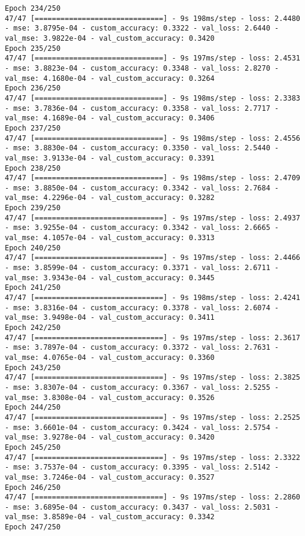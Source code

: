 \begin{lstlisting}
Epoch 234/250
47/47 [==============================] - 9s 198ms/step - loss: 2.4480 - mse: 3.8795e-04 - custom_accuracy: 0.3322 - val_loss: 2.6440 - val_mse: 3.9822e-04 - val_custom_accuracy: 0.3420
Epoch 235/250
47/47 [==============================] - 9s 197ms/step - loss: 2.4531 - mse: 3.8823e-04 - custom_accuracy: 0.3348 - val_loss: 2.8270 - val_mse: 4.1680e-04 - val_custom_accuracy: 0.3264
Epoch 236/250
47/47 [==============================] - 9s 198ms/step - loss: 2.3383 - mse: 3.7836e-04 - custom_accuracy: 0.3358 - val_loss: 2.7717 - val_mse: 4.1689e-04 - val_custom_accuracy: 0.3406
Epoch 237/250
47/47 [==============================] - 9s 198ms/step - loss: 2.4556 - mse: 3.8830e-04 - custom_accuracy: 0.3350 - val_loss: 2.5440 - val_mse: 3.9133e-04 - val_custom_accuracy: 0.3391
Epoch 238/250
47/47 [==============================] - 9s 198ms/step - loss: 2.4709 - mse: 3.8850e-04 - custom_accuracy: 0.3342 - val_loss: 2.7684 - val_mse: 4.2296e-04 - val_custom_accuracy: 0.3282
Epoch 239/250
47/47 [==============================] - 9s 197ms/step - loss: 2.4937 - mse: 3.9255e-04 - custom_accuracy: 0.3342 - val_loss: 2.6665 - val_mse: 4.1057e-04 - val_custom_accuracy: 0.3313
Epoch 240/250
47/47 [==============================] - 9s 197ms/step - loss: 2.4466 - mse: 3.8599e-04 - custom_accuracy: 0.3371 - val_loss: 2.6711 - val_mse: 3.9343e-04 - val_custom_accuracy: 0.3445
Epoch 241/250
47/47 [==============================] - 9s 198ms/step - loss: 2.4241 - mse: 3.8316e-04 - custom_accuracy: 0.3378 - val_loss: 2.6074 - val_mse: 3.9498e-04 - val_custom_accuracy: 0.3411
Epoch 242/250
47/47 [==============================] - 9s 197ms/step - loss: 2.3617 - mse: 3.7897e-04 - custom_accuracy: 0.3372 - val_loss: 2.7631 - val_mse: 4.0765e-04 - val_custom_accuracy: 0.3360
Epoch 243/250
47/47 [==============================] - 9s 197ms/step - loss: 2.3825 - mse: 3.8307e-04 - custom_accuracy: 0.3367 - val_loss: 2.5255 - val_mse: 3.8308e-04 - val_custom_accuracy: 0.3526
Epoch 244/250
47/47 [==============================] - 9s 197ms/step - loss: 2.2525 - mse: 3.6601e-04 - custom_accuracy: 0.3424 - val_loss: 2.5754 - val_mse: 3.9278e-04 - val_custom_accuracy: 0.3420
Epoch 245/250
47/47 [==============================] - 9s 197ms/step - loss: 2.3322 - mse: 3.7537e-04 - custom_accuracy: 0.3395 - val_loss: 2.5142 - val_mse: 3.7246e-04 - val_custom_accuracy: 0.3527
Epoch 246/250
47/47 [==============================] - 9s 197ms/step - loss: 2.2860 - mse: 3.6895e-04 - custom_accuracy: 0.3437 - val_loss: 2.5031 - val_mse: 3.8589e-04 - val_custom_accuracy: 0.3342
Epoch 247/250

\end{lstlisting}
